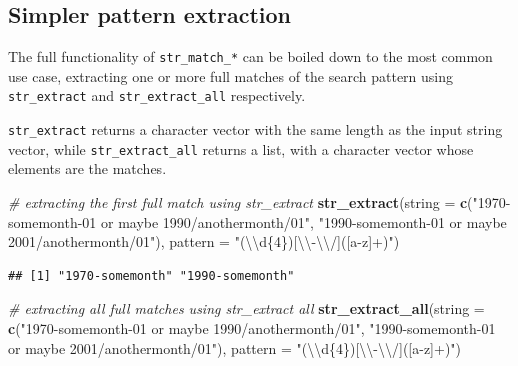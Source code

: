 \documentclass[]{book}
\newenvironment{Shaded}{}{}
\newcommand{\CharTok}[1]{\textcolor[rgb]{0.25,0.44,0.63}{#1}}
\newcommand{\CommentTok}[1]{\textcolor[rgb]{0.38,0.63,0.69}{\textit{#1}}}
\newcommand{\DataTypeTok}[1]{\textcolor[rgb]{0.56,0.13,0.00}{#1}}
\newcommand{\KeywordTok}[1]{\textcolor[rgb]{0.00,0.44,0.13}{\textbf{#1}}}
\newcommand{\NormalTok}[1]{#1}
\newcommand{\StringTok}[1]{\textcolor[rgb]{0.25,0.44,0.63}{#1}}
\begin{document}
\hypertarget{simpler-pattern-extraction}{%
\subsection{Simpler pattern extraction}\label{simpler-pattern-extraction}}

The full functionality of \texttt{str\_match\_*} can be boiled down to the most common use case, extracting one or more full matches of the search pattern using \texttt{str\_extract} and \texttt{str\_extract\_all} respectively.

\texttt{str\_extract} returns a character vector with the same length as the input string vector, while \texttt{str\_extract\_all} returns a list, with a character vector whose elements are the matches.

\begin{Shaded}
\begin{Highlighting}[]
\CommentTok{# extracting the first full match using str_extract}
\KeywordTok{str_extract}\NormalTok{(}\DataTypeTok{string =} \KeywordTok{c}\NormalTok{(}\StringTok{"1970-somemonth-01 or maybe 1990/anothermonth/01"}\NormalTok{,}
                       \StringTok{"1990-somemonth-01 or maybe 2001/anothermonth/01"}\NormalTok{),}
            \DataTypeTok{pattern =} \StringTok{"(}\CharTok{\textbackslash{}\textbackslash{}}\StringTok{d\{4\})[}\CharTok{\textbackslash{}\textbackslash{}}\StringTok{-}\CharTok{\textbackslash{}\textbackslash{}}\StringTok{/]([a-z]+)"}\NormalTok{)}
\end{Highlighting}
\end{Shaded}

\begin{verbatim}
## [1] "1970-somemonth" "1990-somemonth"
\end{verbatim}

\begin{Shaded}
\begin{Highlighting}[]
\CommentTok{# extracting all full matches using str_extract all}
\KeywordTok{str_extract_all}\NormalTok{(}\DataTypeTok{string =} \KeywordTok{c}\NormalTok{(}\StringTok{"1970-somemonth-01 or maybe 1990/anothermonth/01"}\NormalTok{,}
                           \StringTok{"1990-somemonth-01 or maybe 2001/anothermonth/01"}\NormalTok{),}
                \DataTypeTok{pattern =} \StringTok{"(}\CharTok{\textbackslash{}\textbackslash{}}\StringTok{d\{4\})[}\CharTok{\textbackslash{}\textbackslash{}}\StringTok{-}\CharTok{\textbackslash{}\textbackslash{}}\StringTok{/]([a-z]+)"}\NormalTok{)}
\end{Highlighting}
\end{Shaded}
\end{document}
